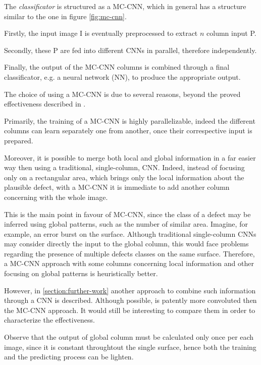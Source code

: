     \par{
        The \emph{classificator} is structured as a MC-CNN, which in general has a structure similar to the one in figure \ref{fig:mc-cnn}. 
    }
    \par{
        Firstly, the input image I is eventually preprocessed to extract $n$ column input P.
    }
    \par{
        Secondly, these P are fed into different CNNs in parallel, therefore independently. 
    }
    \par{
        Finally, the output of the MC-CNN columns is combined through a final classificator, e.g. a neural network (NN), to produce the appropriate output.
    }
    \par{
        The choice of using a MC-CNN is due to several reasons, beyond the proved effectiveness described in \cite{ieee:6248110}.
    }
    \par{
        Primarily, the training of a MC-CNN is highly parallelizable, indeed the different columns can learn separately one from another, once their correspective input is prepared.
    }
    \par{
        Moreover, it is possible to merge both local and global information in a far easier way then using a traditional, single-column, CNN. Indeed, instead of focusing only on a rectangular area, which brings only the local information about the plausible defect, with a MC-CNN it is immediate to add another column concerning with the whole image.
    }
    \par{
        This is the main point in favour of MC-CNN, since the class of a defect may be inferred using global patterns, such as the number of similar area. Imagine, for example, an error burst on the surface. Although traditional single-column CNNs may consider directly the input to the global column, this would face problems regarding the presence of multiple defects classes on the same surface. Therefore, a MC-CNN approach with some columns concerning local information and other focusing on global patterns is heuristically better.
    }
    \par{
        However, in \ref{section:further-work} another approach to combine such information through a CNN is described. Although possible, is patently more convoluted then the MC-CNN approach. It would still be interesting to compare them in order to characterize the effectiveness. 
    }
    \par{
        Observe that the output of global column must be calculated only once per each image, since it is constant throughtout the single surface, hence both the training and the predicting process can be lighten.
    }
